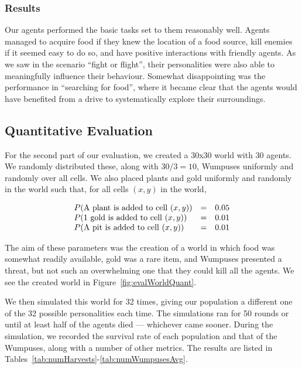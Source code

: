 \subsubsection{Results}

Our agents performed the basic tasks set to them reasonably well. Agents managed to acquire food if they knew the location of a food source, kill enemies if it seemed easy to do so, and have positive interactions with friendly agents. As we saw in the scenario ``fight or flight'', their personalities were also able to meaningfully influence their behaviour. Somewhat disappointing was the performance in ``searching for food'', where it became clear that the agents would have benefited from a drive to systematically explore their surroundings.

\subsection{Quantitative Evaluation}

For the second part of our evaluation, we created a 30x30 world with 30 agents. We randomly distributed these, along with $30/3 = 10$, Wumpuses uniformly and randomly over all cells. We also placed plants and gold uniformly and randomly in the world such that, for all cells $(x,y)$ in the world,

$$
\begin{array}{l l l}
P(\textrm{A plant is added to cell } (x,y)) & = & 0.05\\
P(\textrm{1 gold is added to cell } (x,y)) & = & 0.01\\
P(\textrm{A pit is added to cell } (x,y)) & = & 0.01
\end{array}
$$

The aim of these parameters was the creation of a world in which food was somewhat readily available, gold was a rare item, and Wumpuses presented a threat, but not such an overwhelming one that they could kill all the agents. We see the created world in Figure~\ref{fig:evalWorldQuant}.

We then simulated this world for 32 times, giving our population a different one of the 32 possible personalities each time. The simulations ran for 50 rounds or until at least half of the agents died --- whichever came sooner. During the simulation, we recorded the survival rate of each population and that of the Wumpuses, along with a number of other metrics. The results are listed in Tables~\ref{tab:numHarvests}-\ref{tab:numWumpusesAvg}.

